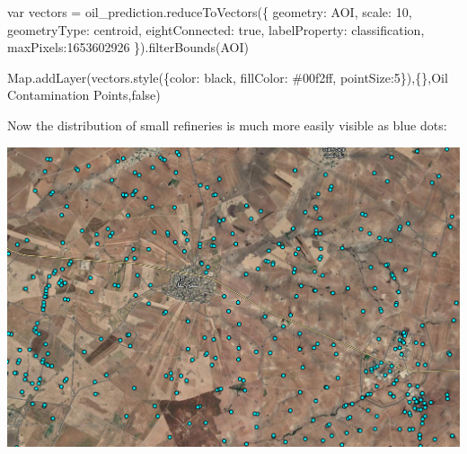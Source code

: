 \documentclass[
  letterpaper,
  DIV=11,
  numbers=noendperiod]{scrreprt}
\newenvironment{Shaded}{\begin{snugshade}}{\end{snugshade}}
\newcommand{\BuiltInTok}[1]{\textcolor[rgb]{0.00,0.23,0.31}{#1}}
\newcommand{\DataTypeTok}[1]{\textcolor[rgb]{0.68,0.00,0.00}{#1}}
\newcommand{\DecValTok}[1]{\textcolor[rgb]{0.68,0.00,0.00}{#1}}
\newcommand{\FunctionTok}[1]{\textcolor[rgb]{0.28,0.35,0.67}{#1}}
\newcommand{\KeywordTok}[1]{\textcolor[rgb]{0.00,0.23,0.31}{#1}}
\newcommand{\NormalTok}[1]{\textcolor[rgb]{0.00,0.23,0.31}{#1}}
\newcommand{\OperatorTok}[1]{\textcolor[rgb]{0.37,0.37,0.37}{#1}}
\newcommand{\StringTok}[1]{\textcolor[rgb]{0.13,0.47,0.30}{#1}}
\begin{document}
\begin{Shaded}
\begin{Highlighting}[]
\KeywordTok{var}\NormalTok{ vectors }\OperatorTok{=}\NormalTok{ oil\_prediction}\OperatorTok{.}\FunctionTok{reduceToVectors}\NormalTok{(\{}
  \DataTypeTok{geometry}\OperatorTok{:}\NormalTok{ AOI}\OperatorTok{,}
  \DataTypeTok{scale}\OperatorTok{:} \DecValTok{10}\OperatorTok{,}
  \DataTypeTok{geometryType}\OperatorTok{:} \StringTok{\textquotesingle{}centroid\textquotesingle{}}\OperatorTok{,}
  \DataTypeTok{eightConnected}\OperatorTok{:} \KeywordTok{true}\OperatorTok{,}
  \DataTypeTok{labelProperty}\OperatorTok{:} \StringTok{\textquotesingle{}classification\textquotesingle{}}\OperatorTok{,}
  \DataTypeTok{maxPixels}\OperatorTok{:}\DecValTok{1653602926}
\NormalTok{  \})}\OperatorTok{.}\FunctionTok{filterBounds}\NormalTok{(AOI)}

\BuiltInTok{Map}\OperatorTok{.}\FunctionTok{addLayer}\NormalTok{(vectors}\OperatorTok{.}\FunctionTok{style}\NormalTok{(\{}\DataTypeTok{color}\OperatorTok{:} \StringTok{\textquotesingle{}black\textquotesingle{}}\OperatorTok{,} \DataTypeTok{fillColor}\OperatorTok{:} \StringTok{\textquotesingle{}\#00f2ff\textquotesingle{}}\OperatorTok{,} \DataTypeTok{pointSize}\OperatorTok{:}\DecValTok{5}\NormalTok{\})}\OperatorTok{,}\NormalTok{\{\}}\OperatorTok{,}\StringTok{\textquotesingle{}Oil Contamination Points\textquotesingle{}}\OperatorTok{,}\KeywordTok{false}\NormalTok{)}
\end{Highlighting}
\end{Shaded}

Now the distribution of small refineries is much more easily visible as
blue dots:

\includegraphics{./images/points.png}
\end{document}
